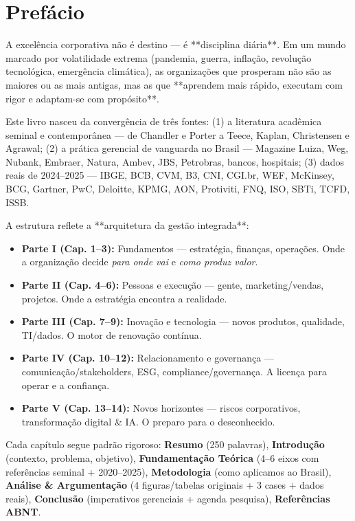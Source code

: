 \chapter*{Prefácio}

A excelência corporativa não é destino — é **disciplina diária**. Em um mundo marcado por volatilidade extrema (pandemia, guerra, inflação, revolução tecnológica, emergência climática), as organizações que prosperam não são as maiores ou as mais antigas, mas as que **aprendem mais rápido, executam com rigor e adaptam-se com propósito**.

Este livro nasceu da convergência de três fontes: (1) a literatura acadêmica seminal e contemporânea — de Chandler e Porter a Teece, Kaplan, Christensen e Agrawal; (2) a prática gerencial de vanguarda no Brasil — Magazine Luiza, Weg, Nubank, Embraer, Natura, Ambev, JBS, Petrobras, bancos, hospitais; (3) dados reais de 2024–2025 — IBGE, BCB, CVM, B3, CNI, CGI.br, WEF, McKinsey, BCG, Gartner, PwC, Deloitte, KPMG, AON, Protiviti, FNQ, ISO, SBTi, TCFD, ISSB.

A estrutura reflete a **arquitetura da gestão integrada**: 
\begin{itemize}
    \item \textbf{Parte I (Cap. 1–3):} Fundamentos — estratégia, finanças, operações. Onde a organização decide \textit{para onde vai} e \textit{como produz valor}.
    \item \textbf{Parte II (Cap. 4–6):} Pessoas e execução — gente, marketing/vendas, projetos. Onde a estratégia encontra a realidade.
    \item \textbf{Parte III (Cap. 7–9):} Inovação e tecnologia — novos produtos, qualidade, TI/dados. O motor de renovação contínua.
    \item \textbf{Parte IV (Cap. 10–12):} Relacionamento e governança — comunicação/stakeholders, ESG, compliance/governança. A licença para operar e a confiança.
    \item \textbf{Parte V (Cap. 13–14):} Novos horizontes — riscos corporativos, transformação digital \& IA. O preparo para o desconhecido.
\end{itemize}

Cada capítulo segue padrão rigoroso: \textbf{Resumo} (250 palavras), \textbf{Introdução} (contexto, problema, objetivo), \textbf{Fundamentação Teórica} (4–6 eixos com referências seminal + 2020–2025), \textbf{Metodologia} (como aplicamos ao Brasil), \textbf{Análise \& Argumentação} (4 figuras/tabelas originais + 3 cases + dados reais), \textbf{Conclusão} (imperativos gerenciais + agenda pesquisa), \textbf{Referências ABNT}.

